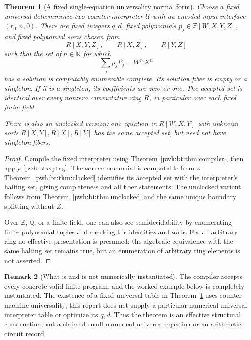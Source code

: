\documentclass[11pt,letterpaper]{article}
\numberwithin{equation}{section}
\newtheorem{theorem}{Theorem}[section]
\theoremstyle{definition}
\newtheorem{remark}[theorem]{Remark}
\newcommand{\N}{\mathbb N}
\newcommand{\Z}{\mathbb Z}
\newcommand{\Q}{\mathbb Q}
\begin{document}
\begin{theorem}[A fixed single-equation universality normal form]\label{pwh:bt:thm:fixed}
Choose a fixed universal deterministic two-counter interpreter $\mathcal U$
with an encoded-input interface $(r_0,n,0)$. There are fixed integers
$q,d$, fixed polynomials $p_j\in\Z[W,X,Y,Z]$, and fixed polynomial sorts
chosen from
\[
 R[X,Y,Z],\qquad R[X,Z],\qquad R[Y,Z]
\]
such that the set of $n\in\N$ for which
\begin{equation}\label{pwh:bt:eq:fixed}
 \sum_j p_jF_j=W^{r_0}X^n
\end{equation}
has a solution is computably enumerable complete. Its solution fiber is
empty or a singleton. If it is a singleton, its coefficients are zero
or one. The accepted set is identical over every nonzero commutative
ring $R$, in particular over each fixed finite field.

There is also an unclocked version: one equation in $R[W,X,Y]$ with
unknown sorts $R[X,Y],R[X],R[Y]$ has the same accepted set, but need not
have singleton fibers.
\end{theorem}

\begin{proof}
Compile the fixed interpreter using Theorem~\ref{pwh:bt:thm:compiler}, then
apply \eqref{pwh:bt:eq:tag}. The source monomial is computable from $n$.
Theorem~\ref{pwh:bt:thm:clocked} identifies its accepted set with the
interpreter's halting set, giving completeness and all fiber statements.
The unclocked variant follows from Theorem~\ref{pwh:bt:thm:unclocked} and the
same unique boundary splitting without $Z$.

Over $\Z$, $\Q$, or a finite field, one can also see semidecidability
by enumerating finite polynomial tuples and checking the identities and
sorts. For an arbitrary ring no effective presentation is presumed:
the algebraic equivalence with the same halting set remains true, but
an enumeration of arbitrary ring elements is not asserted.
\end{proof}

\begin{remark}[What is and is not numerically instantiated]\label{pwh:bt:rem:instantiated}
The compiler accepts every concrete valid finite program, and the worked
example below is completely instantiated. The existence of a fixed
universal table in Theorem~\ref{pwh:bt:thm:fixed} uses counter-machine
universality; this report does not supply a particular numerical
universal interpreter table or optimize its $q,d$. Thus the theorem is
an effective structural construction, not a claimed small numerical
universal equation or an arithmetic-circuit record.
\end{remark}
\end{document}
